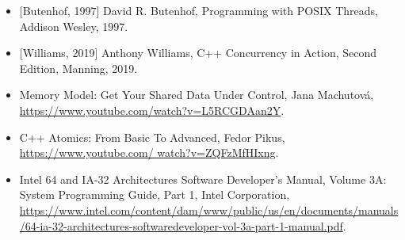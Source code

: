 \begin{itemize}
\item
{[}Butenhof, 1997] David R. Butenhof, Programming with POSIX Threads, Addison Wesley, 1997.

\item
{[}Williams, 2019] Anthony Williams, C++ Concurrency in Action, Second Edition, Manning, 2019.

\item
Memory Model: Get Your Shared Data Under Control, Jana Machutová, \url{https://www.youtube.com/watch?v=L5RCGDAan2Y}.

\item
C++ Atomics: From Basic To Advanced, Fedor Pikus, \url{https://www.youtube.com/ watch?v=ZQFzMfHIxng}.

\item
Intel 64 and IA-32 Architectures Software Developer’s Manual, Volume 3A: System Programming Guide, Part 1, Intel Corporation, \url{https://www.intel.com/content/dam/www/public/us/en/documents/manuals/64-ia-32-architectures-softwaredeveloper-vol-3a-part-1-manual.pdf}.
\end{itemize}